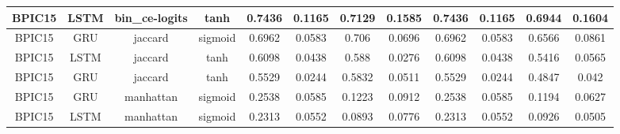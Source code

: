\documentclass{article}%
\begin{document}
\begin{tabular}{|c|c|c|c|c|c|c|c|c|c|c|c|}
\hline%
BPIC15&LSTM&bin\_ce{-}logits&tanh&0.7436&0.1165&0.7129&0.1585&0.7436&0.1165&0.6944&0.1604\\%
\hline%
BPIC15&GRU&jaccard&sigmoid&0.6962&0.0583&0.706&0.0696&0.6962&0.0583&0.6566&0.0861\\%
\hline%
BPIC15&LSTM&jaccard&tanh&0.6098&0.0438&0.588&0.0276&0.6098&0.0438&0.5416&0.0565\\%
\hline%
BPIC15&GRU&jaccard&tanh&0.5529&0.0244&0.5832&0.0511&0.5529&0.0244&0.4847&0.042\\%
\hline%
BPIC15&GRU&manhattan&sigmoid&0.2538&0.0585&0.1223&0.0912&0.2538&0.0585&0.1194&0.0627\\%
\hline%
BPIC15&LSTM&manhattan&sigmoid&0.2313&0.0552&0.0893&0.0776&0.2313&0.0552&0.0926&0.0505\\%
\hline%
\end{tabular}

%
\newpage%
\end{document}
